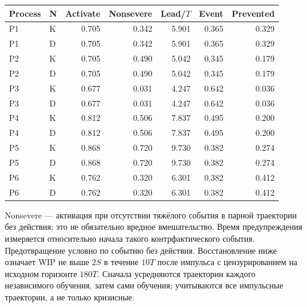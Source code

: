\begin{center}\small\setlength{\tabcolsep}{4pt}\begin{tabular}{llrrrrr}\toprule

Process & N & Activate & Nonsevere & Lead/$T$ & Event & Prevented\\\midrule

P1 & K & 0.705 & 0.342 & 5.901 & 0.365 & 0.329\\

P1 & D & 0.705 & 0.342 & 5.901 & 0.365 & 0.329\\

P2 & K & 0.705 & 0.490 & 5.042 & 0.345 & 0.179\\

P2 & D & 0.705 & 0.490 & 5.042 & 0.345 & 0.179\\

P3 & K & 0.677 & 0.031 & 4.247 & 0.642 & 0.036\\

P3 & D & 0.677 & 0.031 & 4.247 & 0.642 & 0.036\\

P4 & K & 0.812 & 0.506 & 7.837 & 0.495 & 0.200\\

P4 & D & 0.812 & 0.506 & 7.837 & 0.495 & 0.200\\

P5 & K & 0.868 & 0.720 & 9.730 & 0.382 & 0.274\\

P5 & D & 0.868 & 0.720 & 9.730 & 0.382 & 0.274\\

P6 & K & 0.762 & 0.320 & 6.301 & 0.382 & 0.412\\

P6 & D & 0.762 & 0.320 & 6.301 & 0.382 & 0.412\\

\bottomrule\end{tabular}\end{center}

Nonsevere — активация при отсутствии тяжёлого события в парной траектории без действия; это не обязательно вредное вмешательство. Время предупреждения измеряется относительно начала такого контрфактического события. Предотвращение условно по событию без действия. Восстановление ниже означает WIP не выше $2S$ в течение $10T$ после импульса с цензурированием на исходном горизонте $180T$. Сначала усредняются траектории каждого независимого обучения, затем сами обучения; учитываются все импульсные траектории, а не только кризисные.

